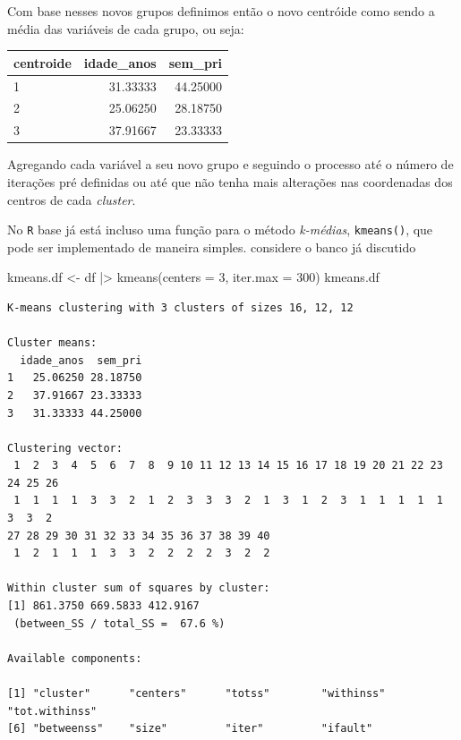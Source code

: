 \documentclass[
  letterpaper,
  DIV=11,
  numbers=noendperiod]{scrreprt}
\newenvironment{Shaded}{\begin{snugshade}}{\end{snugshade}}
\newcommand{\AttributeTok}[1]{\textcolor[rgb]{0.40,0.45,0.13}{#1}}
\newcommand{\DecValTok}[1]{\textcolor[rgb]{0.68,0.00,0.00}{#1}}
\newcommand{\FunctionTok}[1]{\textcolor[rgb]{0.28,0.35,0.67}{#1}}
\newcommand{\NormalTok}[1]{\textcolor[rgb]{0.00,0.23,0.31}{#1}}
\newcommand{\OtherTok}[1]{\textcolor[rgb]{0.00,0.23,0.31}{#1}}
\newcommand{\SpecialCharTok}[1]{\textcolor[rgb]{0.37,0.37,0.37}{#1}}
\begin{document}
Com base nesses novos grupos definimos então o novo centróide como sendo
a média das variáveis de cada grupo, ou seja:

\begin{longtable}[]{@{}lrr@{}}
\toprule()
centroide & idade\_anos & sem\_pri \\
\midrule()
\endhead
1 & 31.33333 & 44.25000 \\
2 & 25.06250 & 28.18750 \\
3 & 37.91667 & 23.33333 \\
\bottomrule()
\end{longtable}

Agregando cada variável a seu novo grupo e seguindo o processo até o
número de iterações pré definidas ou até que não tenha mais alterações
nas coordenadas dos centros de cada \emph{cluster}.

No \texttt{R} base já está incluso uma função para o método
\emph{k-médias}, \texttt{kmeans()}, que pode ser implementado de maneira
simples. considere o banco já discutido

\begin{Shaded}
\begin{Highlighting}[]
\NormalTok{kmeans.df }\OtherTok{\textless{}{-}}\NormalTok{ df }\SpecialCharTok{|\textgreater{}}
  \FunctionTok{kmeans}\NormalTok{(}\AttributeTok{centers =} \DecValTok{3}\NormalTok{, }\AttributeTok{iter.max =} \DecValTok{300}\NormalTok{)}
\NormalTok{kmeans.df}
\end{Highlighting}
\end{Shaded}

\begin{verbatim}
K-means clustering with 3 clusters of sizes 16, 12, 12

Cluster means:
  idade_anos  sem_pri
1   25.06250 28.18750
2   37.91667 23.33333
3   31.33333 44.25000

Clustering vector:
 1  2  3  4  5  6  7  8  9 10 11 12 13 14 15 16 17 18 19 20 21 22 23 24 25 26 
 1  1  1  1  3  3  2  1  2  3  3  3  2  1  3  1  2  3  1  1  1  1  1  3  3  2 
27 28 29 30 31 32 33 34 35 36 37 38 39 40 
 1  2  1  1  1  3  3  2  2  2  2  3  2  2 

Within cluster sum of squares by cluster:
[1] 861.3750 669.5833 412.9167
 (between_SS / total_SS =  67.6 %)

Available components:

[1] "cluster"      "centers"      "totss"        "withinss"     "tot.withinss"
[6] "betweenss"    "size"         "iter"         "ifault"      
\end{verbatim}
\end{document}
